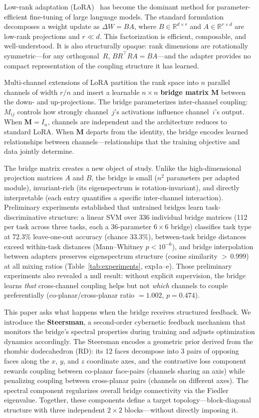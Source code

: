 \documentclass[11pt]{article}
\begin{document}
Low-rank adaptation (LoRA)~\cite{hu2022lora} has become the dominant
method for parameter-efficient fine-tuning of large language models.
The standard formulation decomposes a weight update as
$\Delta W = BA$, where $B \in \mathbb{R}^{d \times r}$ and
$A \in \mathbb{R}^{r \times d}$ are low-rank projections and
$r \ll d$. This factorization is efficient, composable, and
well-understood. It is also structurally opaque: rank dimensions are
rotationally symmetric---for any orthogonal~$R$,
$BR^\top RA = BA$---and the adapter provides no compact representation
of the coupling structure it has learned.

Multi-channel extensions of LoRA partition the rank space into $n$
parallel channels of width $r/n$ and insert a learnable
$n \times n$ \textbf{bridge matrix} $\mathbf{M}$ between the down-
and up-projections. The bridge parameterizes inter-channel coupling:
$M_{ij}$ controls how strongly channel~$j$'s activations
influence channel~$i$'s output. When $\mathbf{M} = I_n$, channels
are independent and the architecture reduces to standard LoRA. When
$\mathbf{M}$ departs from the identity, the bridge encodes learned
relationships between channels---relationships that the training
objective and data jointly determine.

The bridge matrix creates a new object of study. Unlike the
high-dimensional projection matrices $A$ and $B$, the bridge is small
($n^2$ parameters per adapted module), invariant-rich (its
eigenspectrum is rotation-invariant), and directly interpretable (each
entry quantifies a specific inter-channel interaction). Preliminary
experiments established that untrained bridges learn task-discriminative
structure: a linear SVM over 336 individual bridge matrices (112 per
task across three tasks, each a 36-parameter $6 \times 6$ bridge)
classifies task type at 72.3\% leave-one-out accuracy (chance 33.3\%),
between-task bridge distances exceed within-task distances
(Mann--Whitney $p < 10^{-6}$), and
bridge interpolation between adapters preserves eigenspectrum structure
(cosine similarity ${>}\,0.999$) at all mixing ratios
(Table~\ref{tab:experiments}, exp1a--e). Those preliminary experiments
also revealed a null result: without explicit supervision, the bridge
learns \emph{that} cross-channel coupling helps but not \emph{which}
channels to couple preferentially (co-planar/cross-planar
ratio $= 1.002$, $p = 0.474$).

This paper asks what happens when the bridge receives structured
feedback. We introduce the \textbf{Steersman}, a second-order
cybernetic feedback mechanism that monitors the bridge's spectral
properties during training and adjusts optimization dynamics
accordingly. The Steersman encodes a geometric prior derived from the
rhombic dodecahedron (RD): its 12 faces decompose into 3 pairs of
opposing faces along the $x$, $y$, and $z$ coordinate axes, and the
contrastive loss component rewards coupling between co-planar
face-pairs (channels sharing an axis) while penalizing coupling
between cross-planar pairs (channels on different axes). The spectral
component regularizes overall bridge connectivity via the Fiedler
eigenvalue. Together, these components define a target
topology---block-diagonal structure with three independent
$2 \times 2$ blocks---without directly imposing it.
\end{document}
